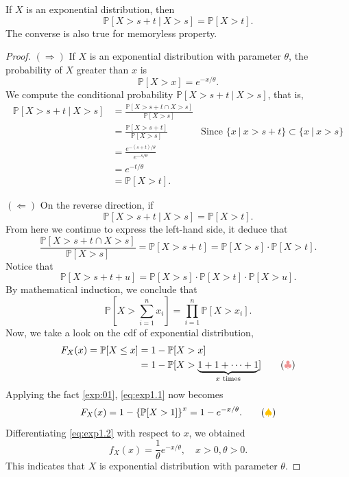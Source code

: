 \begin{theorem}
    If $X$ is an exponential distribution, then 
    \begin{equation}
        \mathbb{P}[X > s + t \> | \> X > s] = \mathbb{P}[X > t].
    \end{equation}
    The converse is also true for memoryless property.
\end{theorem}
\begin{proof}
    $(\Rightarrow)$ If $X$ is an exponential distribution with parameter $\theta$, the probability of $X$ greater than 
    $x$ is 
    \[
        \mathbb{P}[X > x] = e^{-x/\theta}.
    \]
    We compute the conditional probability $\mathbb{P}[X > s + t \> | \> X > s]$, that is, 
    \begin{align*}
        \mathbb{P}[X > s + t \> | \> X > s] &= \frac{\mathbb{P}[X > s + t \cap X > s]}{\mathbb{P}[X > s]}\\
        &= \frac{\mathbb{P}[X > s + t]}{\mathbb{P}[X > s]} & \text{Since } \{x \> | \> x>s+t\} \subset \{x \> | \> x>s\} \\
        &= \frac{e^{-(s+t)/\theta}}{e^{-s/\theta}}\\
        &= e^{-t / \theta}\\
        &= \mathbb{P}[X > t].
    \end{align*}

    $(\Leftarrow)$ On the reverse direction, if 
    \begin{equation}
        \mathbb{P}[X > s + t \> | \> X > s] = \mathbb{P}[X > t].
    \end{equation}
    From here we continue to express the left-hand side, it deduce that 
    \[
        \frac{\mathbb{P}[X > s + t \cap X > s]}{\mathbb{P}[X > s]} = \mathbb{P}[X > s+t] 
        = \mathbb{P}[X > s]\cdot \mathbb{P}[X > t].
    \]
    Notice that 
    \[
        \mathbb{P}[X > s+t+u] 
        = \mathbb{P}[X > s] \cdot \mathbb{P}[X > t] \cdot \mathbb{P}[X > u].
    \]
    By mathematical induction, we conclude that
    \begin{equation}
        \mathbb{P} \left[ X > \sum^n_{i=1} x_i\right] 
        = \prod_{i=1}^{n} \mathbb{P}[X > x_i]. \label{exp:01}
    \end{equation}
    Now, we take a look on the cdf of exponential distribution, 
    \begin{align*}
        F_X(x) = \mathbb{P}[X \leq x] &= 1 - \mathbb{P}[X > x]\\
        &= 1 - \mathbb{P}[X > \underbrace{1+1+\cdots + 1}_{x \text{ times}}] \label{eq:exp1.1} \tag{{\color{myred} $\clubsuit $}}\\
    \end{align*}
    Applying the fact \eqref{exp:01}, \eqref{eq:exp1.1} now becomes
    \[
        F_X(x) = 1 - \left\{ \mathbb{P}[X > 1]\right\}^x = 1 - e^{-x/\theta}. \label{eq:exp1.2} \tag{{\color{myyellow} $\spadesuit$}}\\
    \]
    Differentiating \eqref{eq:exp1.2} with respect to $x$, we obtained
    \[
        f_X(x) = \frac{1}{\theta} e^{-x/\theta}, \quad x > 0, \theta > 0.
    \]
    This indicates that $X$ is exponential distribution with parameter $\theta$.
\end{proof}

